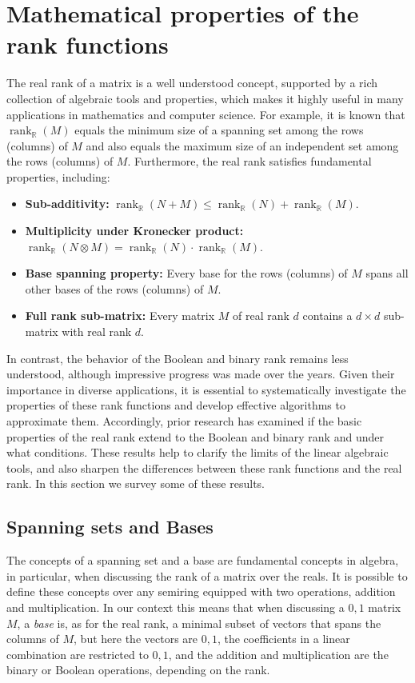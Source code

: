 \documentclass[11pt]{article}
\newcommand{\rank}{\mathop{\mathrm{rank}}}
\newcommand{\Rreal}{{\rank}_\mathbb{R}}
\begin{document}
\section{Mathematical properties of the rank functions}
\label{Sec-properties}

The real rank of a matrix is a well understood concept, supported by a rich collection of  algebraic tools and properties, which makes it
highly useful in many applications in mathematics and computer science.
For example, it is known that $\Rreal(M)$ equals the minimum size of a spanning set among the rows (columns) of $M$ and also equals the maximum size of an independent set among the rows (columns) of $M$.
Furthermore, the real rank satisfies fundamental properties, including:
\begin{itemize}
\item {\bf Sub-additivity:} $\Rreal(N + M) \leq \Rreal(N) + \Rreal(M)$.

\item {\bf Multiplicity under Kronecker product:} $\Rreal(N \otimes M) = \Rreal(N)\cdot \Rreal(M)$.

\item {\bf Base spanning property:} Every base for the rows (columns) of $M$ spans all other bases of the rows (columns) of $M$.

\item {\bf Full rank sub-matrix:} Every matrix $M$ of real rank $d$ contains a $d \times d$ sub-matrix  with real rank $d$.
\end{itemize}

In contrast, the behavior of the Boolean and binary rank remains less understood, although impressive progress was made over the years.
Given their importance in diverse applications,
it is essential to systematically investigate the properties of these rank functions and develop effective algorithms to approximate them.
Accordingly, prior research has examined if the basic properties of the real rank extend to
the Boolean and binary rank and under what conditions. These results help to clarify the limits of the linear algebraic tools,
and also sharpen the differences between these rank functions and the real rank.
In this section we survey some of these results.


\subsection{Spanning sets and Bases}
\label{Sec-base}

The concepts of a spanning set and a base are fundamental concepts in algebra, in particular, when discussing the rank of a matrix over the reals.
It is possible to define these concepts over any semiring equipped with two operations, addition and multiplication.
In our context this means that when discussing a $0,1$ matrix $M$,  a {\em base} is, as for the real rank, a minimal subset of vectors that spans the columns
of $M$, but here the vectors are $0,1$, the coefficients in a linear combination are restricted to $0,1$,
 and the addition and multiplication are the binary or Boolean operations, depending on the rank.
\end{document}
